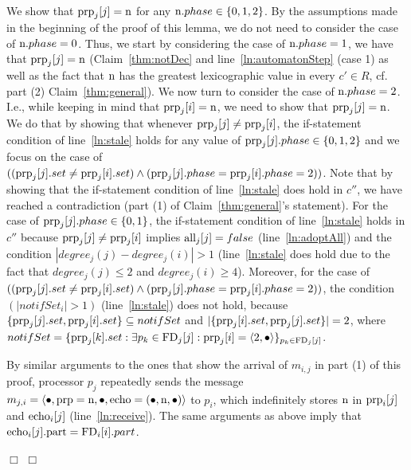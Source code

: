 \documentclass[11pt]{article}
\newcommand{\notif}{prp}
\newcommand{\notifSet}{notifSet}
\newenvironment{proof}{\noindent{\bf Proof.}}{\hfill$\Box$}
\begin{document}
\begin{proof}
\begin{proof}
We show that $\textnormal{\notif}_j[j]=\textnormal{n}$ for any $\textnormal{n}.phase \in \{0,1,2\}$. By the assumptions made in the beginning of the proof of this lemma, we do not need to consider the case of $\textnormal{n}.phase=0$. Thus, we start by considering the case of $\textnormal{n}.phase=1$, we have that $\textnormal{\notif}_j[j]=\textnormal{n}$ (Claim~\ref{thm:notDec} and line~\ref{ln:automatonStep} (case 1) as well as the fact that $\textnormal{n}$ has the greatest lexicographic value in every $c' \in R$, cf. part (2) Claim~\ref{thm:general}).
We now turn to consider the case of $\textnormal{n}.phase=2$. I.e.,  while keeping in mind that $\textnormal{\notif}_j[i]=\textnormal{n}$, we need to show that $\textnormal{\notif}_j[j]=\textnormal{n}$.
We do that by showing that whenever $\textnormal{\notif}_j[j] \neq \textnormal{\notif}_j[i]$, the if-statement condition of line~\ref{ln:stale} holds for any value of $\textnormal{\notif}_j[j].phase\in \{0,1,2\}$ and we focus on the case of $((\textnormal{\notif}_j[j].set \neq \textnormal{\notif}_j[i].set) \land (\textnormal{\notif}_j[j].phase = \textnormal{\notif}_j[i].phase =2))$. Note that by showing that the if-statement condition of line~\ref{ln:stale} does hold in $c''$, we have reached  a contradiction (part (1) of Claim~\ref{thm:general}'s statement). 
For the case of $\textnormal{\notif}_j[j].phase\in \{0,1\}$, the if-statement condition of line~\ref{ln:stale} holds in $c''$ because $\textnormal{\notif}_j[j] \neq \textnormal{\notif}_j[i]$ implies $\textnormal{all}_j[j]=false$ (line~\ref{ln:adoptAll}) and the condition $|degree_j(j)-degree_j(i)|>1$ (line~\ref{ln:stale} does hold due to the fact that  $degree_j(j)\leq 2$ and $degree_j(i)\geq 4$). Moreover, for the case of $((\textnormal{\notif}_j[j].set \neq \textnormal{\notif}_j[i].set) \land (\textnormal{\notif}_j[j].phase = \textnormal{\notif}_j[i].phase =2))$, the condition $(|\notifSet_i|>1)$  (line~\ref{ln:stale}) does not hold, because $\{ \textnormal{\notif}_j[j].set, \textnormal{\notif}_j[i].set \} \subseteq  \notifSet$ and $|\{ \textnormal{\notif}_j[i].set, \textnormal{\notif}_j[j].set \} |=2$, where $\notifSet=\{ \textnormal{\notif}_j[k].set : \exists p_k \in \textnormal{FD}_j[j]:\textnormal{\notif}_j[i] = \langle 2, \bullet \rangle \}_{p_k \in \textnormal{FD}_j[j]}$.






 By similar arguments to the ones that show the arrival of $m_{i,j}$ in part (1) of this proof, processor $p_j$  repeatedly sends the message $m_{j,i} = \langle \bullet, \textnormal{\notif}=\textnormal{n}, \bullet, \textnormal{echo}=(\bullet, \textnormal{n}, \bullet) \rangle$ to $p_i$, which indefinitely stores $\textnormal{n}$ in $\textnormal{\notif}_i[j]$ and $\textnormal{echo}_i[j]$ (line~\ref{ln:receive}). The same arguments as above imply that $\textnormal{echo}_i[j].\textnormal{part} = \textnormal{FD}_i[i].part$.


\end{proof}
\end{proof}
\end{document}
